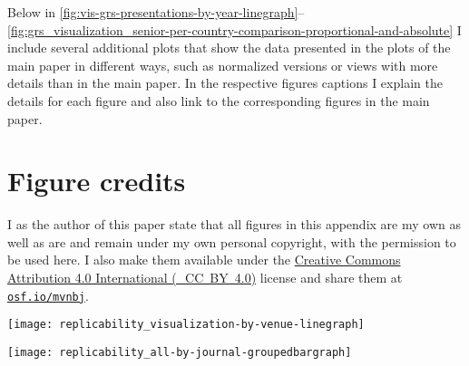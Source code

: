 \documentclass[conference,svgnames]{vgtc}                     %
\newcommand{\ie}{i.\,e.}
\newcommand{\osfid}{mvnbj}
\begin{document}
Below in \autoref{fig:vis-grs-presentations-by-year-linegraph}--\ref{fig:grs_visualization_senior-per-country-comparison-proportional-and-absolute} I include several additional plots that show the data presented in the plots of the main paper in different ways, such as normalized versions or views with more details than in the main paper. In the respective figures captions I explain the details for each figure and also link to the corresponding figures in the main paper.

\section*{Figure credits}
\label{sec:figure_credits_appx}

I as the author of this paper state that all figures in this appendix are my own as well as are and remain under my own personal copyright, with the permission to be used here. I also make them available under the \href{https://creativecommons.org/licenses/by/4.0/}{Creative Commons At\-tri\-bu\-tion 4.0 International (\ccLogo\,\ccAttribution\ \mbox{CC BY 4.0})} license and share them at \href{https://osf.io/\osfid/}{\texttt{osf.io/\osfid}}.

\begin{figure*}
	\centering
	\texttt{[image: replicability\_visualization-by-venue-linegraph]}
	\caption{Line graph version of \autoref{fig:teaser} (but without the stacking aspect of \autoref{fig:teaser}, so here I show one line for only the GRSI-awarded papers of the venue plus one line for all papers of a venue): Papers that can clearly be classified as visualization work (visualization conferences and special issues in journals) by \emph{presentation} year (\ie, based on the \emph{conference years}, in which the papers were presented) and their subset with GRS.\textsuperscript{\ref{foot:vis_presentations},\ref{foot:c-and-g-special}}}
	\label{fig:vis-grs-presentations-by-year-linegraph}
\end{figure*}

\begin{figure*}
	\centering
	\texttt{[image: replicability\_all-by-journal-groupedbargraph]}
	\caption{Bar chart version of \autoref{fig:grs-overall}: Overall development of papers with GRS, by publication venues (and their article \emph{publication} years).}
	\label{fig:grs-overall-bars}
\end{figure*}
\end{document}

